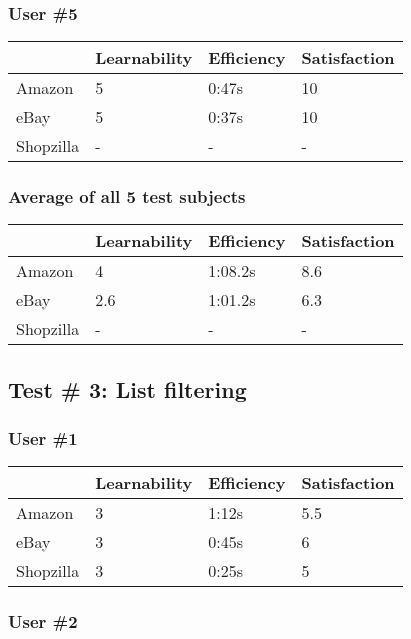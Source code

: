 \documentclass[11pt, oneside]{article}   	%
\begin{document}
\subsubsection{User \#5}

\begin{tabular}{| l | l | l | l |}
    \hline
     & Learnability & Efficiency & Satisfaction \\ \hline
    Amazon & 5 & 0:47s & 10 \\ \hline
    eBay & 5 & 0:37s & 10 \\ \hline
    Shopzilla & - & - & - \\\hline
\end{tabular}

\subsubsection{Average of all 5 test subjects}

\begin{tabular}{| l | l | l | l |}
    \hline
     & Learnability & Efficiency & Satisfaction \\ \hline
    Amazon & 4 & 1:08.2s & 8.6 \\ \hline
    eBay & 2.6 & 1:01.2s & 6.3 \\ \hline
    Shopzilla & - & - & - \\\hline
\end{tabular}

\subsection{Test \# 3: List filtering}

\subsubsection{User \#1}

\begin{tabular}{| l | l | l | l |}
    \hline
     & Learnability & Efficiency & Satisfaction \\ \hline
    Amazon & 3 & 1:12s & 5.5 \\ \hline
    eBay & 3 & 0:45s & 6 \\ \hline
    Shopzilla & 3 & 0:25s & 5 \\\hline
\end{tabular}

\subsubsection{User \#2}
\end{document}
